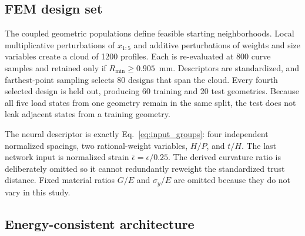 \documentclass[11pt]{article}
\newcommand{\Rmin}{R_{\min}}
\begin{document}
\subsection{FEM design set}

The coupled geometric populations define feasible starting neighborhoods. Local multiplicative perturbations of $x_{1:5}$ and additive perturbations of weights and size variables create a cloud of 1200 profiles. Each is re-evaluated at 800 curve samples and retained only if $\Rmin\ge0.905$~mm. Descriptors are standardized, and farthest-point sampling selects 80 designs that span the cloud. Every fourth selected design is held out, producing 60 training and 20 test geometries. Because all five load states from one geometry remain in the same split, the test does not leak adjacent states from a training geometry.

The neural descriptor is exactly Eq.~\eqref{eq:input_groups}: four independent normalized spacings, two rational-weight variables, $H/P$, and $t/H$. The last network input is normalized strain $\bar\epsilon=\epsilon/0.25$. The derived curvature ratio is deliberately omitted so it cannot redundantly reweight the standardized trust distance. Fixed material ratios $G/E$ and $\sigma_y/E$ are omitted because they do not vary in this study.

\subsection{Energy-consistent architecture}
\end{document}
